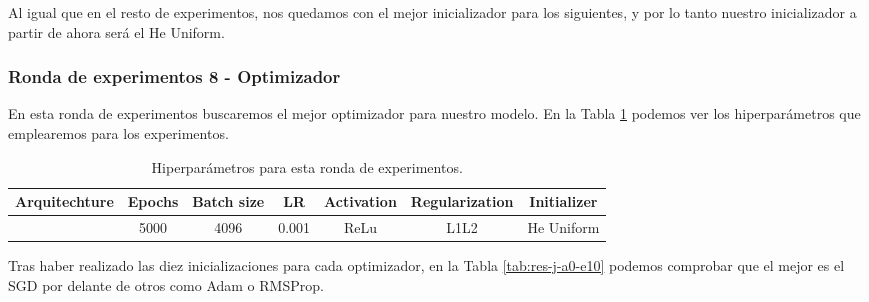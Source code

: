 \documentclass{article}
\begin{document}
Al igual que en el resto de experimentos, nos quedamos con el mejor inicializador para los siguientes, y por lo tanto nuestro inicializador a partir de ahora será el He Uniform.

\subsubsection{Ronda de experimentos 8 - Optimizador}
En esta ronda de experimentos buscaremos el mejor optimizador para nuestro modelo. En la Tabla \ref{tab:hip-j-a0-e10} podemos ver los hiperparámetros que emplearemos para los experimentos.

\begin{table}[h!]
    \begin{center}
    \begin{tabular}{| c | c | c | c | c | c | c |}
            \textbf{Arquitechture} & \textbf{Epochs} & \textbf{Batch size} & \textbf{LR} & \textbf{Activation} &\textbf{Regularization} & \textbf{Initializer}\\ \hline
            [32,16,8] & 5000 & 4096 & 0.001 & ReLu & L1L2 & He Uniform \\ \hline
        \end{tabular}
        \caption{Hiperpar\'ametros para esta ronda de experimentos.}
        \label{tab:hip-j-a0-e10}
    \end{center}
\end{table}

Tras haber realizado las diez inicializaciones para cada optimizador, en la Tabla \ref{tab:res-j-a0-e10} podemos comprobar que el mejor es el SGD por delante de otros como Adam o RMSProp.
\end{document}
